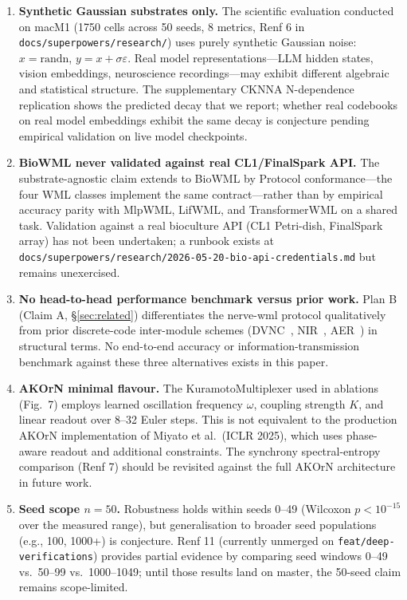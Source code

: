 \documentclass[10pt,twocolumn]{article}
\begin{document}
\begin{enumerate}
\item \textbf{Synthetic Gaussian substrates only.} The scientific evaluation conducted on macM1 (1750 cells across 50 seeds, 8 metrics, Renf 6 in \texttt{docs/superpowers/research/}) uses purely synthetic Gaussian noise: $x = \mathrm{randn}$, $y = x + \sigma\varepsilon$. Real model representations---LLM hidden states, vision embeddings, neuroscience recordings---may exhibit different algebraic and statistical structure. The supplementary CKNNA N-dependence replication shows the predicted decay that we report; whether real codebooks on real model embeddings exhibit the same decay is conjecture pending empirical validation on live model checkpoints.

\item \textbf{BioWML never validated against real CL1/FinalSpark API.} The substrate-agnostic claim extends to BioWML by Protocol conformance---the four WML classes implement the same contract---rather than by empirical accuracy parity with MlpWML, LifWML, and TransformerWML on a shared task. Validation against a real bioculture API (CL1 Petri-dish, FinalSpark array) has not been undertaken; a runbook exists at \texttt{docs/superpowers/research/2026-05-20-bio-api-credentials.md} but remains unexercised.

\item \textbf{No head-to-head performance benchmark versus prior work.} Plan B (Claim A, \S\ref{sec:related}) differentiates the nerve-wml protocol qualitatively from prior discrete-code inter-module schemes (DVNC~\cite{liu2021dvnc}, NIR~\cite{pedersen2024nir}, AER~\cite{aer2025biohybrid}) in structural terms. No end-to-end accuracy or information-transmission benchmark against these three alternatives exists in this paper.

\item \textbf{AKOrN minimal flavour.} The KuramotoMultiplexer used in ablations (Fig.~7) employs learned oscillation frequency $\omega$, coupling strength $K$, and linear readout over 8--32 Euler steps. This is not equivalent to the production AKOrN implementation of Miyato et al.~(ICLR 2025), which uses phase-aware readout and additional constraints. The synchrony spectral-entropy comparison (Renf 7) should be revisited against the full AKOrN architecture in future work.

\item \textbf{Seed scope $n=50$.} Robustness holds within seeds 0--49 (Wilcoxon $p < 10^{-15}$ over the measured range), but generalisation to broader seed populations (e.g., 100, 1000+) is conjecture. Renf 11 (currently unmerged on \texttt{feat/deep-verifications}) provides partial evidence by comparing seed windows 0--49 vs.\ 50--99 vs.\ 1000--1049; until those results land on master, the 50-seed claim remains scope-limited.


\end{enumerate}
\end{document}
